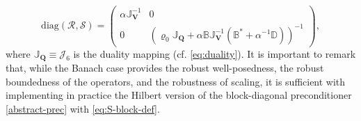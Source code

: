 \documentclass[11pt, reqno, a4paper, twoside]{article}
\newcommand{\bu}{\boldsymbol{u}}
\newcommand{\bV}{\mathbf{V}}
\newcommand{\bQ}{\mathbf{Q}}
\newcommand{\bbD}{\mathbb{D}}
\newcommand{\bbB}{\mathbb{B}}
\newcommand{\bbJ}{\mathbb{J}}
\newcommand{\cJ}{\mathcal{J}}
\newcommand{\cS}{\mathcal{S}}
\newcommand{\cR}{\mathcal{R}}
\numberwithin{equation}{section}
\numberwithin{remark}{section}
\numberwithin{figure}{section}
\numberwithin{table}{section}
\newcommand{\cgray}[1]{{\leavevmode\color{gray}{#1}}}
\begin{document}
{\begin{equation}\label{abstract-prec-Banach} 
 \mathrm{diag}(\cR,\cS) = \begin{pmatrix}\alpha \bbJ_{\bV}^{-1} & 0 \\ 0 & (\varrho_0 \bbJ_{\bQ} + \alpha \bbB\bbJ_{\bV}^{-1}(\bbB^* +\alpha^{-1}\bbD))^{-1}
\end{pmatrix}, 
\end{equation}
where $\bbJ_{\bQ} \equiv \cJ_{6}$ is the duality mapping (cf. \eqref{eq:duality}). 
It is important to remark that, while the Banach case provides the robust well-posedness, the robust boundedness of the operators, and the robustness of scaling, it is sufficient with implementing in practice the Hilbert version of the block-diagonal preconditioner \eqref{abstract-prec} with \eqref{eq:S-block-def}.  
}

\end{document}
